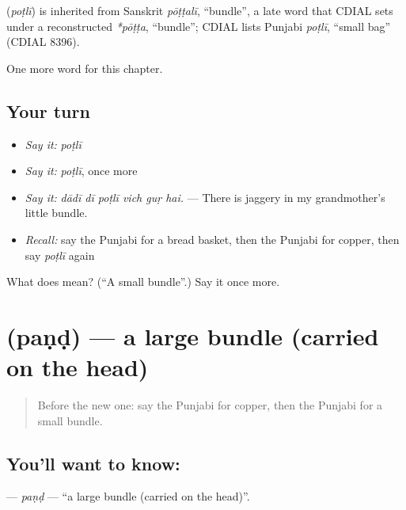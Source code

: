 \begin{cousinweb}
\textbf{} (\emph{poṭlī}) is inherited from Sanskrit \emph{pōṭṭalī}, \textquotedblleft{}bundle\textquotedblright{}, a late word that CDIAL sets under a reconstructed \emph{*pōṭṭa}, \textquotedblleft{}bundle\textquotedblright{}; CDIAL lists Punjabi \emph{poṭlī}, \textquotedblleft{}small bag\textquotedblright{} (CDIAL 8396).
\end{cousinweb}

\begin{grammarlens}[title={What you've built}]
One more word for this chapter.
\end{grammarlens}

\subsection*{Your turn}
\begin{itemize}
\raggedright
  \item \emph{Say it:} \emph{poṭlī}
  \item \emph{Say it:} \emph{poṭlī}, once more
  \item \emph{Say it:} \emph{dādī dī poṭlī vich guṛ hai.} — There is jaggery in my grandmother's little bundle.
  \item \emph{Recall:} say the Punjabi for a bread basket, then the Punjabi for copper, then say \emph{poṭlī} again
\end{itemize}

\begin{tcolorbox}[breakable,colback=teal!4,colframe=teal!35!black,title={Before you move on}]
What does  mean? (\textquotedblleft{}A small bundle\textquotedblright{}.) Say it once more.
\end{tcolorbox}
\section[\texorpdfstring{\pa{ਪੰਡ} (paṇḍ)}{ਪੰਡ (paṇḍ)}]{ (paṇḍ) — a large bundle (carried on the head)}

\label{lesson:PA-C252-pand}



\begin{quote}
Before the new one: say the Punjabi for copper, then the Punjabi for a small bundle.
\end{quote}

\subsection*{You'll want to know: }
\textbf{} — \emph{paṇḍ} — \textquotedblleft{}a large bundle (carried on the head)\textquotedblright{}.

